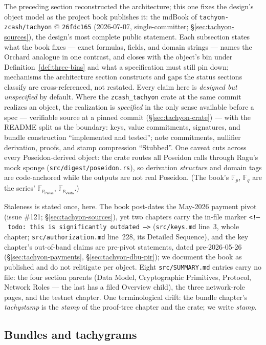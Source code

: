 \documentclass[11pt,a4paper]{article}
\theoremstyle{definition}
\newcommand{\F}{\mathbb{F}}
\newcommand{\Pallas}{\ensuremath{\mathsf{Pallas}}}
\newcommand{\Vesta}{\ensuremath{\mathsf{Vesta}}}
\begin{document}
The preceding section reconstructed the architecture; this one fixes the
design's object model as the project book publishes it: the mdBook of
\texttt{tachyon-zcash/tachyon} @ \texttt{26fdc165} (2026-07-07,
single-committer; \S\ref{sec:tachyon-sources}), the design's most complete
public statement. Each subsection states what the book fixes --- exact
formulas, fields, and domain strings --- names the Orchard analogue in one
contrast, and closes with the object's bin under
Definition~\ref{def:three-bins} and what a specification must still pin
down; mechanisms the architecture section constructs and gaps the status
sections classify are cross-referenced, not restated. Every claim here is
\emph{designed but unspecified} by default. Where the
\texttt{zcash\_tachyon} crate at the same commit realizes an object, the
realization is \emph{specified} in the only sense available before a spec
--- verifiable source at a pinned commit (\S\ref{sec:tachyon-crate}) ---
with the README split as the boundary: keys, value commitments, signatures,
and bundle construction ``implemented and tested''; note commitments,
nullifier derivation, proofs, and stamp compression ``Stubbed''. One caveat
cuts across every Poseidon-derived object: the crate routes all Poseidon
calls through Ragu's mock sponge (\texttt{src/digest/poseidon.rs}), so
derivation \emph{structure} and domain tags are code-anchored while the
outputs are not real Poseidon. (The book's $\F_p$, $\F_q$ are the series'
$\F_{p_{\Pallas}}$, $\F_{p_{\Vesta}}$.)

Staleness is stated once, here. The book post-dates the May-2026 payment
pivot (issue \#121; \S\ref{sec:tachyon-sources}), yet two chapters carry
the in-file marker \texttt{<!--\ todo: this is significantly outdated -->}
(\texttt{src/keys.md} line~3, whole chapter; \texttt{src/authorization.md}
line~228, its Detailed Sequence), and the key chapter's out-of-band claims
are pre-pivot statements, dated pre-2026-05-26
(\S\ref{sec:tachyon-payments}, \S\ref{sec:tachyon-dbu-pir}); we document
the book as published and do not relitigate per object. Eight
\texttt{src/SUMMARY.md} entries carry no file: the four section parents
(Data Model, Cryptographic Primitives, Protocol, Network Roles --- the
last has a filed Overview child), the three network-role pages, and the
testnet chapter. One terminological drift: the bundle chapter's
\emph{tachystamp} is the \emph{stamp} of the proof-tree chapter and the
crate; we write \emph{stamp}.

\subsection{Bundles and tachygrams}\label{sec:tachyon-design-bundle}
\end{document}

